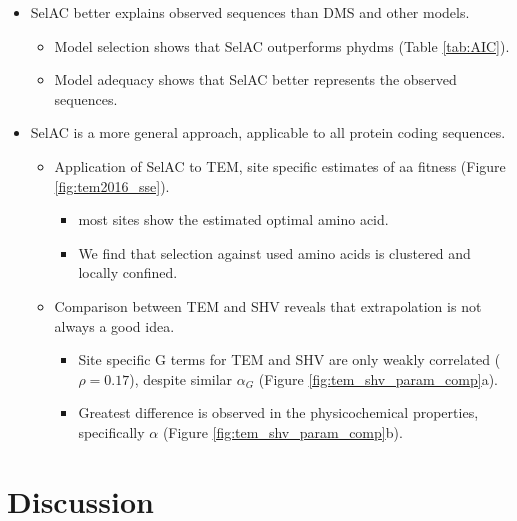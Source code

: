 \documentclass[12pt]{article}
\begin{document}
\begin{itemize}
	\item SelAC better explains observed sequences than DMS and other models.
	\begin{itemize}
		\item Model selection shows that SelAC outperforms phydms (Table \ref{tab:AIC}).
		\item Model adequacy shows that SelAC better represents the observed sequences.
	\end{itemize}
 
	\item SelAC is a more general approach, applicable to all protein coding sequences.
	\begin{itemize}
		\item Application of SelAC to TEM, site specific estimates of aa fitness (Figure \ref{fig:tem2016_sse}).
		\begin{itemize}
			\item most sites show the estimated optimal amino acid.
			\item We find that selection against used amino acids is clustered and locally confined.
		\end{itemize}
		\item Comparison between TEM and SHV reveals that extrapolation is not always a good idea.
		\begin{itemize}
			\item Site specific G terms for TEM and SHV are only weakly correlated ($\rho = 0.17$), despite similar $\alpha_G$ (Figure \ref{fig:tem_shv_param_comp}a).
			\item Greatest difference is observed in the physicochemical properties, specifically $\alpha$ (Figure \ref{fig:tem_shv_param_comp}b).
		\end{itemize}
	\end{itemize}
\end{itemize}

\section*{Discussion}
\end{document}
